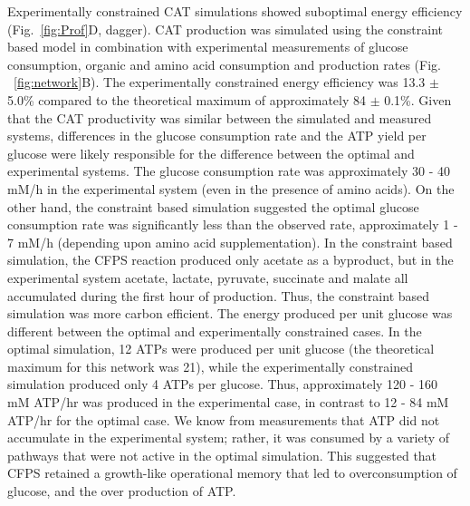 \documentclass[journal=asbcd6,manuscript=article]{achemso}
\begin{document}
Experimentally constrained CAT simulations showed suboptimal energy efficiency (Fig.~\ref{fig:Prof}D, dagger).
CAT production was simulated using the constraint based model in combination with experimental measurements of glucose consumption, organic and amino acid consumption and production rates (Fig. ~\ref{fig:network}B).
The experimentally constrained energy efficiency was 13.3 $\pm$ 5.0\% compared to the theoretical maximum of approximately 84 $\pm$ 0.1\%.
Given that the CAT productivity was similar between the simulated and measured systems, differences in the glucose consumption rate and the ATP yield per glucose were likely responsible for the difference between the optimal and experimental systems.
The glucose consumption rate was approximately 30 - 40 mM/h in the experimental system (even in the presence of amino acids).
On the other hand, the constraint based simulation suggested the optimal glucose consumption rate was significantly less than the observed rate, approximately 1 - 7 mM/h (depending upon amino acid supplementation).
In the constraint based simulation, the CFPS reaction produced only acetate as a byproduct, but in the experimental system acetate, lactate, pyruvate, succinate and malate all accumulated during the first hour of production.
Thus, the constraint based simulation was more carbon efficient.
The energy produced per unit glucose was different between the optimal and experimentally constrained cases.
In the optimal simulation, 12 ATPs were produced per unit glucose (the theoretical maximum for this network was 21), while the experimentally constrained simulation produced only 4 ATPs per glucose.
Thus, approximately 120 - 160 mM ATP/hr was produced in the experimental case, in contrast to 12 - 84 mM ATP/hr for the optimal case.
We know from measurements that ATP did not accumulate in the experimental system; rather, it was consumed by a variety of pathways that were not active in the optimal simulation.
This suggested that CFPS retained a growth-like operational memory that led to overconsumption of glucose, and the over production of ATP.
\end{document}
